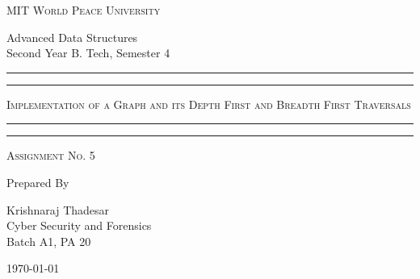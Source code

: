 \documentclass[11pt]{article}
\begin{document}
\begin{titlepage}
    \centering


    \huge\textsc{
        MIT World Peace University
    }\\

    \vspace{0.75\baselineskip} %

    \LARGE{
        Advanced Data Structures\\
        Second Year B. Tech, Semester 4
    }

    \vfill %


    \rule{\textwidth}{1.6pt}\vspace*{-\baselineskip}\vspace*{2pt}
    \rule{\textwidth}{0.6pt}
    \vspace{0.75\baselineskip} %



    \huge{\textsc{
            Implementation of a Graph and its Depth First and Breadth First Traversals
        }} \\



    \vspace{0.5\baselineskip} %
    \rule{\textwidth}{0.6pt}\vspace*{-\baselineskip}\vspace*{2.8pt}
    \rule{\textwidth}{1.6pt}

    \vspace{1\baselineskip} %


    \LARGE\textsc{
        Assignment No. 5
    } %
    \vfill


    Prepared By
    \vspace{0.5\baselineskip} %

    \Large{
        Krishnaraj Thadesar \\
        Cyber Security and Forensics\\
        Batch A1, PA 20
    }


    \vspace{0.5\baselineskip} %
    \today

\end{titlepage}
\end{document}
